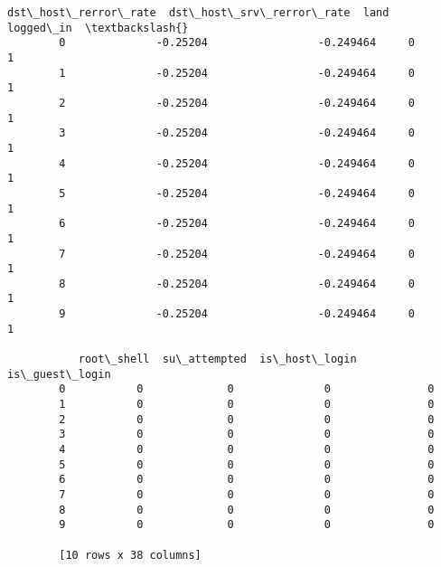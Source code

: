 \documentclass[11pt]{article}
\begin{document}
\begin{Verbatim}[commandchars=\\\{\}]
           dst\_host\_rerror\_rate  dst\_host\_srv\_rerror\_rate  land  logged\_in  \textbackslash{}
        0              -0.25204                 -0.249464     0          1   
        1              -0.25204                 -0.249464     0          1   
        2              -0.25204                 -0.249464     0          1   
        3              -0.25204                 -0.249464     0          1   
        4              -0.25204                 -0.249464     0          1   
        5              -0.25204                 -0.249464     0          1   
        6              -0.25204                 -0.249464     0          1   
        7              -0.25204                 -0.249464     0          1   
        8              -0.25204                 -0.249464     0          1   
        9              -0.25204                 -0.249464     0          1   
        
           root\_shell  su\_attempted  is\_host\_login  is\_guest\_login  
        0           0             0              0               0  
        1           0             0              0               0  
        2           0             0              0               0  
        3           0             0              0               0  
        4           0             0              0               0  
        5           0             0              0               0  
        6           0             0              0               0  
        7           0             0              0               0  
        8           0             0              0               0  
        9           0             0              0               0  
        
        [10 rows x 38 columns]
\end{Verbatim}
            
\end{document}
